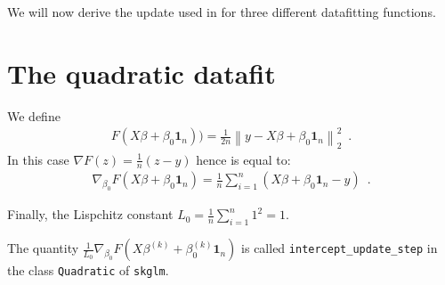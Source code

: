 \documentclass{article}
\newcommand{\norm}[1]{ \left\lVert {#1} \right\rVert}
\newcommand{\ones}[1]{\boldsymbol{1}_#1}
\begin{document}
We will now derive the update used in  for three different datafitting functions. 

\section{The quadratic datafit}
We define 
\begin{align}
    F(X\beta + \beta_0\ones{n})) = \frac{1}{2n}\norm{y - X\beta + \beta_0\ones{n}}^2_2
    \enspace .
\end{align}
In this case $\nabla F(z) = \frac{1}{n}(z - y)$ hence  is equal to:
\begin{align}
    \nabla_{\beta_0}F(X\beta + \beta_0\ones{n}) = \frac{1}{n}\sum_{i=1}^n(X\beta + \beta_0\ones{n} - y)
    \enspace .
\end{align}

Finally, the Lispchitz constant $L_0 = \frac{1}{n}\sum_{i=1}^n 1^2 = 1$.

The quantity $\frac{1}{L_0}\nabla_{\beta_0}F(X\beta^{(k)} + \beta_0^{(k)}\ones{n})$ is called \texttt{intercept\_update\_step} in the class \texttt{Quadratic} of \texttt{skglm}.
\end{document}
